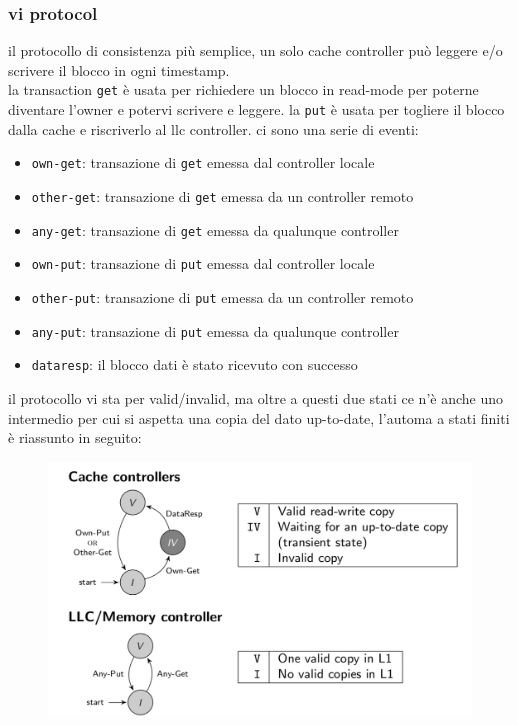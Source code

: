\documentclass[12pt, oneside]{extbook} %
\begin{document}
\subsubsection{vi protocol}
il protocollo di consistenza più semplice, un solo cache controller può leggere e/o scrivere il blocco in ogni timestamp.\\ la transaction \texttt{get} è usata per richiedere un blocco in read-mode per poterne diventare l'owner e potervi scrivere e leggere. la \texttt{put} è usata per togliere il blocco dalla cache e riscriverlo al llc controller. ci sono una serie di eventi:
\begin{itemize}
	\item \texttt{own-get}: transazione di \texttt{get} emessa dal controller locale
	\item \texttt{other-get}: transazione di \texttt{get} emessa da un controller remoto
	\item \texttt{any-get}: transazione di \texttt{get} emessa da qualunque controller
	\item \texttt{own-put}: transazione di \texttt{put} emessa dal controller locale
	\item \texttt{other-put}: transazione di \texttt{put} emessa da un controller remoto
	\item \texttt{any-put}: transazione di \texttt{put} emessa da qualunque controller
	\item \texttt{dataresp}: il blocco dati è stato ricevuto con successo
\end{itemize}
il protocollo vi sta per valid/invalid, ma oltre a questi due stati ce n'è anche uno intermedio per cui si aspetta una copia del dato up-to-date, l'automa a stati finiti è riassunto in seguito:\\
\begin{figure}[!h]
	\includegraphics[scale=0.3]{immagini/vi_prot.png}
\end{figure}
\end{document}
